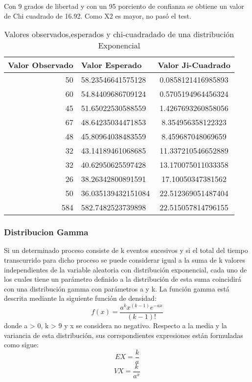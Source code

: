 \documentclass{article}
\begin{document}
  Con 9 grados de libertad y con un 95 porciento de confianza se obtiene un valor de Chi cuadrado de 16.92. Como X2 es mayor, no pasó el test.
  \begin{table*}
    \begin{center}
      \begin{tabular}{| r | l | c |}\hline
      Valor Observado & Valor Esperado &  Valor Ji-Cuadrado \\ \hline
      50 & 58.23546641575128 & 0.0858121416985893 \\
      60 & 54.84409686709124 & 0.5705194964456324 \\
      45 & 51.65022530588559 & 1.4267693260858056 \\
      67 & 48.64235034471853 & 8.354956358122323 \\
      48 & 45.80964038483559 & 8.459687048069659 \\
      32 & 43.14189461068685 & 11.337210546652889 \\
      32 & 40.62950625597428 & 13.170075011033358 \\
      26 & 38.26342800891591 & 17.10050347381562 \\
      50 & 36.035139432151084 & 22.512369051487404 \\
      584 & 582.7482523739898 & 22.515057814796155\\ \hline
      \end{tabular}
      \caption{Valores observados,esperados y chi-cuadradado de una distribución Exponencial}
    \end{center}
  \end{table*}








  \subsubsection{Distribucion Gamma}
  Si un determinado proceso consiste de k eventos sucesivos y si el total del tiempo transcurrido para dicho proceso se puede considerar igual a la suma de k valores independientes de la variable aleatoria con distribución
  exponencial, cada uno de los cuales tiene un parámetro definido a la distribución de esta suma coincidirá con una distribución gamma con parámetros a y k.
  La función gamma está descrita mediante la siguiente función de densidad:
  \begin{equation}
    f(x) = \frac{a^{k}x^{(k-1)}e^{-ax}}{(k-1)!}
  \end{equation}
  donde a > 0, k > 9 y x se considera no negativo.
  Respecto a la media y la variancia de esta distribución, sus corrspondientes expresiones están formuladas como sigue:
  \begin{equation}
    EX = \frac{k}{a}
  \end{equation}
  \begin{equation}
    VX = \frac{k}{a^{x}}
  \end{equation}
\end{document}
